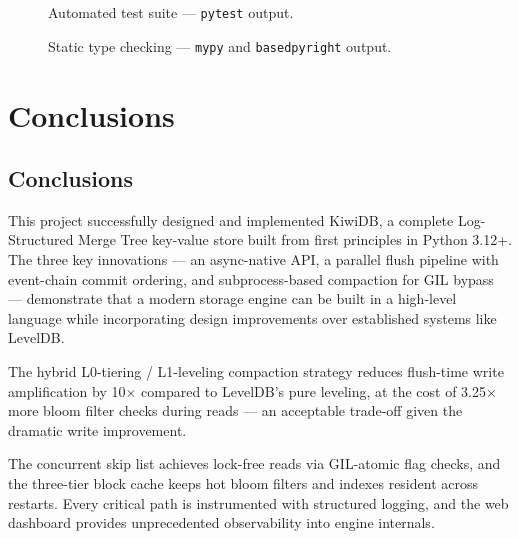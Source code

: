 \documentclass[oneside,a4paper,12pt]{book}
\begin{document}
\begin{figure}[H]
\centering
{}
\caption{Automated test suite --- \texttt{pytest} output.}
\label{fig:screen-pytest}
\end{figure}

\begin{figure}[H]
\centering
{}
\caption{Static type checking --- \texttt{mypy} and \texttt{basedpyright} output.}
\label{fig:screen-typecheck}
\end{figure}


\chapter{Conclusions}

\section{Conclusions}

This project successfully designed and implemented KiwiDB, a complete Log-Structured Merge Tree key-value store built from first principles in Python 3.12+. The three key innovations --- an async-native API, a parallel flush pipeline with event-chain commit ordering, and subprocess-based compaction for GIL bypass --- demonstrate that a modern storage engine can be built in a high-level language while incorporating design improvements over established systems like LevelDB.

The hybrid L0-tiering / L1-leveling compaction strategy reduces flush-time write amplification by 10$\times$ compared to LevelDB's pure leveling, at the cost of 3.25$\times$ more bloom filter checks during reads --- an acceptable trade-off given the dramatic write improvement.

The concurrent skip list achieves lock-free reads via GIL-atomic flag checks, and the three-tier block cache keeps hot bloom filters and indexes resident across restarts. Every critical path is instrumented with structured logging, and the web dashboard provides unprecedented observability into engine internals.
\end{document}
